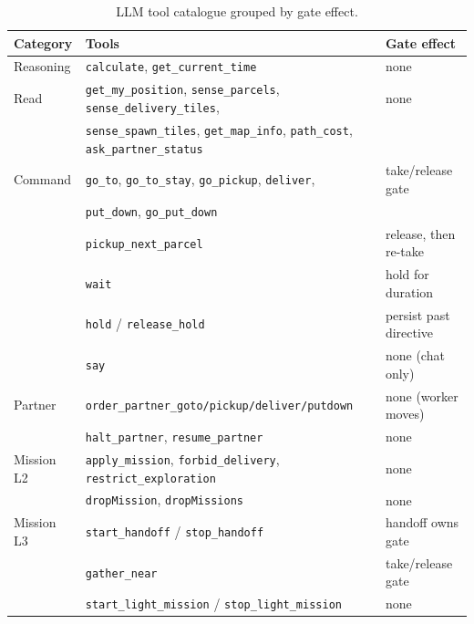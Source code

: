 \begin{table}[H]
\centering\small
\begin{tabular}{@{}lll@{}}
\toprule
\textbf{Category} & \textbf{Tools} & \textbf{Gate effect} \\
\midrule
Reasoning  & \texttt{calculate}, \texttt{get\_current\_time} & none \\
Read       & \texttt{get\_my\_position}, \texttt{sense\_parcels}, \texttt{sense\_delivery\_tiles}, & none \\
           & \texttt{sense\_spawn\_tiles}, \texttt{get\_map\_info}, \texttt{path\_cost}, \texttt{ask\_partner\_status} & \\
Command    & \texttt{go\_to}, \texttt{go\_to\_stay}, \texttt{go\_pickup}, \texttt{deliver}, & take/release gate \\
           & \texttt{put\_down}, \texttt{go\_put\_down} & \\
           & \texttt{pickup\_next\_parcel} & release, then re-take \\
           & \texttt{wait} & hold for duration \\
           & \texttt{hold} / \texttt{release\_hold} & persist past directive \\
           & \texttt{say} & none (chat only) \\
Partner    & \texttt{order\_partner\_goto/pickup/deliver/putdown} & none (worker moves) \\
           & \texttt{halt\_partner}, \texttt{resume\_partner} & none \\
Mission L2 & \texttt{apply\_mission}, \texttt{forbid\_delivery}, \texttt{restrict\_exploration} & none \\
           & \texttt{dropMission}, \texttt{dropMissions} & none \\
Mission L3 & \texttt{start\_handoff} / \texttt{stop\_handoff} & handoff owns gate \\
           & \texttt{gather\_near} & take/release gate \\
           & \texttt{start\_light\_mission} / \texttt{stop\_light\_mission} & none \\
\bottomrule
\end{tabular}
\caption{LLM tool catalogue grouped by gate effect.}
\label{tab:tools}
\end{table}

